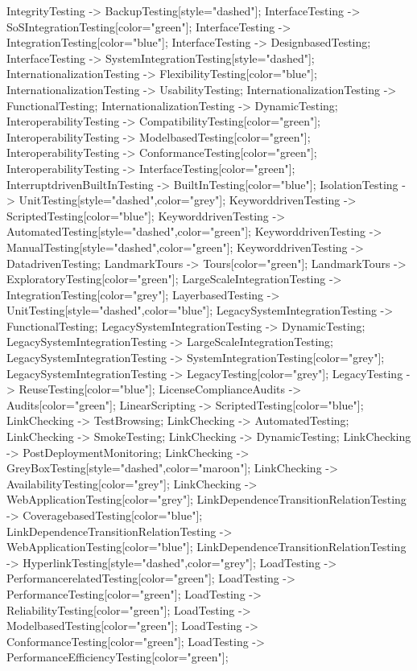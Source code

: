 \documentclass{article}
\begin{document}
{IntegrityTesting -> BackupTesting[style="dashed"];
InterfaceTesting -> SoSIntegrationTesting[color="green"];
InterfaceTesting -> IntegrationTesting[color="blue"];
InterfaceTesting -> DesignbasedTesting;
InterfaceTesting -> SystemIntegrationTesting[style="dashed"];
InternationalizationTesting -> FlexibilityTesting[color="blue"];
InternationalizationTesting -> UsabilityTesting;
InternationalizationTesting -> FunctionalTesting;
InternationalizationTesting -> DynamicTesting;
InteroperabilityTesting -> CompatibilityTesting[color="green"];
InteroperabilityTesting -> ModelbasedTesting[color="green"];
InteroperabilityTesting -> ConformanceTesting[color="green"];
InteroperabilityTesting -> InterfaceTesting[color="green"];
InterruptdrivenBuiltInTesting -> BuiltInTesting[color="blue"];
IsolationTesting -> UnitTesting[style="dashed",color="grey"];
KeyworddrivenTesting -> ScriptedTesting[color="blue"];
KeyworddrivenTesting -> AutomatedTesting[style="dashed",color="green"];
KeyworddrivenTesting -> ManualTesting[style="dashed",color="green"];
KeyworddrivenTesting -> DatadrivenTesting;
LandmarkTours -> Tours[color="green"];
LandmarkTours -> ExploratoryTesting[color="green"];
LargeScaleIntegrationTesting -> IntegrationTesting[color="grey"];
LayerbasedTesting -> UnitTesting[style="dashed",color="blue"];
LegacySystemIntegrationTesting -> FunctionalTesting;
LegacySystemIntegrationTesting -> DynamicTesting;
LegacySystemIntegrationTesting -> LargeScaleIntegrationTesting;
LegacySystemIntegrationTesting -> SystemIntegrationTesting[color="grey"];
LegacySystemIntegrationTesting -> LegacyTesting[color="grey"];
LegacyTesting -> ReuseTesting[color="blue"];
LicenseComplianceAudits -> Audits[color="green"];
LinearScripting -> ScriptedTesting[color="blue"];
LinkChecking -> TestBrowsing;
LinkChecking -> AutomatedTesting;
LinkChecking -> SmokeTesting;
LinkChecking -> DynamicTesting;
LinkChecking -> PostDeploymentMonitoring;
LinkChecking -> GreyBoxTesting[style="dashed",color="maroon"];
LinkChecking -> AvailabilityTesting[color="grey"];
LinkChecking -> WebApplicationTesting[color="grey"];
LinkDependenceTransitionRelationTesting -> CoveragebasedTesting[color="blue"];
LinkDependenceTransitionRelationTesting -> WebApplicationTesting[color="blue"];
LinkDependenceTransitionRelationTesting -> HyperlinkTesting[style="dashed",color="grey"];
LoadTesting -> PerformancerelatedTesting[color="green"];
LoadTesting -> PerformanceTesting[color="green"];
LoadTesting -> ReliabilityTesting[color="green"];
LoadTesting -> ModelbasedTesting[color="green"];
LoadTesting -> ConformanceTesting[color="green"];
LoadTesting -> PerformanceEfficiencyTesting[color="green"];
}
\end{document}
